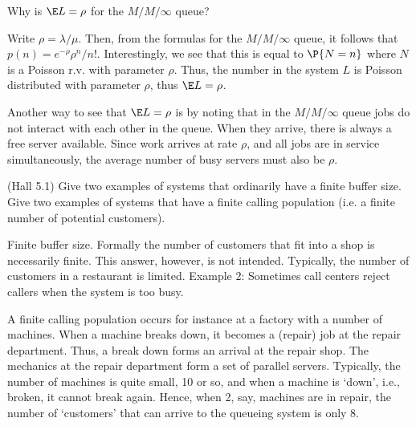 \begin{exercise}{\faFlask}
 Why is $\E L=\rho$ for the $M/M/\infty$ queue? 
 \begin{solution}
 Write $\rho = \lambda /\mu$. Then, from the formulas for the
   $M/M/\infty$ queue, it follows that $p(n) = e^{-\rho} \rho^n/n!$.
   Interestingly, we see that this is equal to $\P{N=n}$ where $N$ is
   a Poisson r.v.  with parameter $\rho$. Thus, the number in the
   system $L$ is Poisson distributed with parameter $\rho$, thus
   $\E L = \rho$.

   Another way to see that $\E L=\rho$ is by noting that in the
   $M/M/\infty$ queue jobs do not interact with each other in the
   queue. When they arrive, there is always a free server
   available. Since work arrives at rate $\rho$, and all jobs are in
   service simultaneously, the average number of busy servers must
   also be $\rho$.
\end{solution}
\end{exercise}


\begin{exercise}{\faPhoto}(Hall 5.1) Give two examples of systems that
  ordinarily have a finite buffer size. Give two examples of systems
  that have a finite calling population (i.e. a finite number of potential customers).
  \begin{solution}
Finite buffer size. Formally the number of customers that fit into a
shop is necessarily finite. This answer, however, is not
intended. Typically, the number of customers in a restaurant is
limited. Example 2: Sometimes call centers reject callers when the system is too busy.

A finite calling population occurs for instance at a factory with a
number of machines. When a machine breaks down, it becomes a (repair)
job at the repair department.  Thus, a break down forms an arrival at
the repair shop.  The mechanics at the repair department form a set of
parallel servers. Typically, the number of machines is quite small, 10 or
so, and when a machine is `down', i.e., broken, it cannot break again.
Hence, when 2, say, machines are in repair, the number of `customers'
that can arrive to the queueing system is only 8. 
  \end{solution}
\end{exercise}


